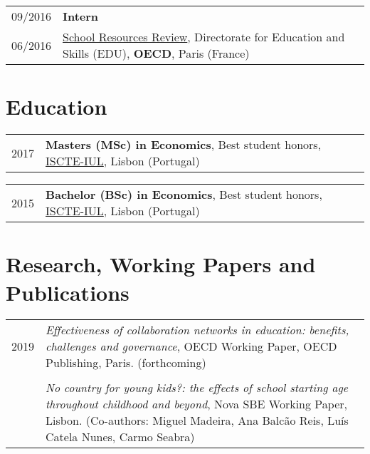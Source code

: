 \documentclass[a4paper,11pt]{article} %
\begin{document}
\begin{tabular}{r|p{13cm}}
	09/2016 & \textbf{Intern} \\
   06/2016 & \href{http://www.oecd.org/education/school-resources-review/}{School Resources Review}, Directorate for Education and Skills (EDU), \textbf{OECD}, Paris (France) \\
	
\end{tabular}


\section[Education]{\faGraduationCap \hspace{3pt} Education}

\begin{tabular}{r|p{13cm}}
	2017 & \textbf{Masters (MSc) in Economics}, Best student honors, \href{https://iscte-iul.pt/}{ISCTE-IUL}, Lisbon (Portugal) \\
\end{tabular}

\begin{tabular}{r|p{13cm}}
	2015 & \textbf{Bachelor (BSc) in Economics}, Best student honors, \href{https://iscte-iul.pt/}{ISCTE-IUL}, Lisbon (Portugal)\\
\end{tabular}


\section[Research, Working Papers and Publications]{\faBook \hspace{3pt} Research, Working Papers and Publications}

\begin{tabular}{r|p{13cm}}
2019	& {\textit{Effectiveness of collaboration networks in education: benefits, challenges and governance}}, OECD Working Paper, OECD Publishing, Paris. (forthcoming) \\
	& \\
	&  {\textit{No country for young kids?: the effects of school starting age throughout childhood and beyond}}, Nova SBE Working Paper, Lisbon. (Co-authors: Miguel Madeira, Ana Balcão Reis, Luís Catela Nunes, Carmo Seabra) \\
\end{tabular}
\end{document}
